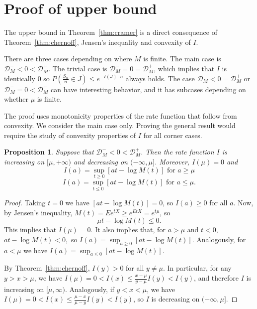 \documentclass[12pt]{article}
\newtheorem{proposition}[equation]{Proposition}
\theoremstyle{definition}
\newcommand{\D}{\mathcal{D}}
\newcommand{\E}{\mathbb{E}}
\renewcommand{\P}{\mathbb{P}}
\renewcommand{\ge}{\geqslant}
\renewcommand{\le}{\leqslant}
\renewcommand{\t}{t}
\renewcommand{\E}{E}
\renewcommand{\P}{P}
\begin{document}
\section{Proof of upper bound}

The upper bound in Theorem~\ref{thm:cramer} is a direct consequence of Theorem~\ref{thm:chernoff}, Jensen's inequality and convexity of $I$.


There are three cases depending on where $M$ is finite.
The main case is $\D_M^- < 0 < \D_M^+$.
The trivial case is $\D_M^- = 0 = \D_M^+$, which implies that $I$ is identically $0$ so $\P\left( \tfrac{S_n}{n} \in J \right) \le e^{-I(J) \cdot n}$ always holds.
The case $\D_M^- < 0 = \D_M^+$ or $\D_M^- = 0 < \D_M^+$ can have interesting behavior, and it has subcases depending on whether $\mu$ is finite.

The proof uses monotonicity properties of the rate function that follow from convexity.
We consider the main case only.
Proving the general result would require the study of convexity properties of $I$ for all corner cases.

\begin{proposition}
\label{prop:ratefunction}
Suppose that $\D_M^- < 0 < \D_M^+$.
Then the rate function $I$ is increasing on $[\mu,+\infty)$ and decreasing on $(-\infty,\mu]$.
Moreover,
$I(\mu)=0$
and
\[
I(a)=\sup_{\t \ge 0}[a\t - \log M(\t)]
\text{ for } a \ge \mu
\]
\[
I(a)=\sup_{\t \le 0}[a\t - \log M(\t)]
\text{ for } a \le \mu
.
\]
\end{proposition}
\begin{proof}
Taking $\t=0$ we have $[a\t - \log M(\t)] = 0$, so $I(a)\ge 0$ for all $a$.
Now, by Jensen's inequality, $M(\t)=\E e^{\t X} \ge e^{\E\t X} = e^{\t \mu}$, so
\[
\mu \t - \log M(\t) \le 0.
\]
This implies that $I(\mu) = 0$.
It also implies that, for $a>\mu$ and $\t<0$,
\(
a \t - \log M(\t) < 0
,
\)
so $I(a)=\sup_{a \ge 0}[a\t - \log M(\t)]$.
Analogously, for $a<\mu$ we have $I(a)=\sup_{a \le 0}[a\t - \log M(\t)]$.

By Theorem~\ref{thm:chernoff}, $I(y)>0$ for all $y\ne \mu$.
In particular, for any $y>x>\mu$, we have $I(\mu)=0 < I(x) \le \frac{x-\mu}{y-\mu} I(y) < I(y)$, and therefore $I$ is increasing on $[\mu,\infty)$.
Analogously, if $y<x<\mu$, we have $I(\mu)=0 < I(x) \le \frac{\mu-x}{\mu-y} I(y) < I(y)$, so $I$ is decreasing on $(-\infty,\mu]$.
\end{proof}
\end{document}
